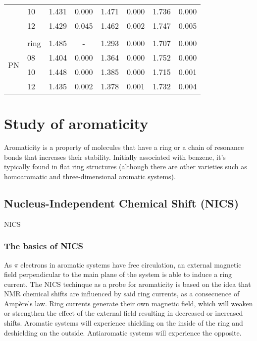 \begin{table}
\begin{tabular}{@{}rlcccccc@{}}
        & 10 & 1.431 & 0.000 & 1.471 & 0.000 & 1.736 & 0.000 \\
        & 12 & 1.429 & 0.045 & 1.462 & 0.002 & 1.747 & 0.005 \\
        \\
        \multirow{4}{*}{PN} & ring & 1.485 & - & 1.293 & 0.000 & 1.707 & 0.000 \\
        & 08 & 1.404 & 0.000 & 1.364 & 0.000 & 1.752 & 0.000 \\
        & 10 & 1.448 & 0.000 & 1.385 & 0.000 & 1.715 & 0.001 \\
        & 12 & 1.435 & 0.002 & 1.378 & 0.001 & 1.732 & 0.004 \\
        \bottomrule
    \end{tabular}
\end{table}

\section{Study of aromaticity}

Aromaticity is a property of molecules that have a ring or a chain of resonance bonds that increases their stability.
Initially associated with benzene, it’s typically found in flat ring structures (although there are other varieties such as homoaromatic and three-dimensional aromatic systems).

\subsection{Nucleus-Independent Chemical Shift (NICS)}

NICS

\subsubsection{The basics of NICS}

As $\pi$ electrons in aromatic systems have free circulation, an external magnetic field perpendicular to the main plane of the system is able to induce a ring current.
The NICS techinque as a probe for aromaticity is based on the idea that NMR chemical shifts are influenced by said ring currents, as a consecuence of Ampère’s law.
Ring currents generate their own magnetic field, which will weaken or strengthen the effect of the external field resulting in decreased or increased shifts.
Aromatic systems will experience shielding on the inside of the ring and deshielding on the outside.
Antiaromatic systems will experience the opposite.

